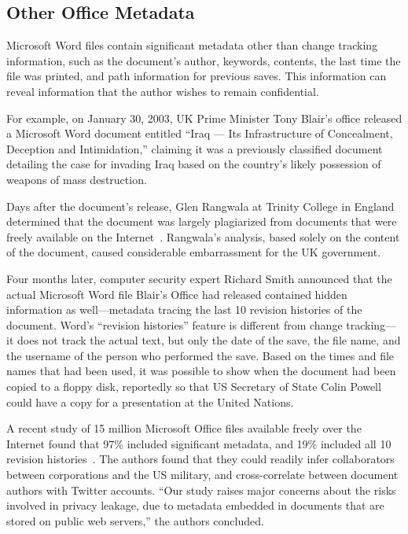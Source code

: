 \subsection{Other Office Metadata}

Microsoft Word files contain significant metadata other than change
tracking information, such as the document's author, keywords,
contents, the last time the file was printed, and path information for
previous saves. This information can reveal information that the
author wishes to remain confidential.

For example, on January 30, 2003,  UK Prime Minister Tony Blair's office released a Microsoft Word document entitled ``Iraq --- Its
Infrastructure of Concealment, Deception and Intimidation,'' claiming
it was a previously classified document detailing the case
for invading Iraq based on the country's likely possession of weapons
of mass destruction. 

Days after the document's release, Glen Rangwala at
Trinity College in England determined that the document was largely
plagiarized from documents that were freely available on the
Internet~\cite{rangwala-2003}.  Rangwala's analysis, based solely on
the content of the document, caused considerable embarrassment for the
UK government.

Four months later, computer security expert Richard Smith
announced that the actual Microsoft Word file Blair's Office had
released contained hidden information as well---metadata tracing the
last 10 revision histories of the document. Word's ``revision
histories'' feature is different from change tracking---it does not
track the actual text, but only the date of the save, the file name,
and the username of the person who performed the save. Based on the
times and file names that had been used, it was possible to show when
the document had been copied to a floppy
disk, reportedly so that US Secretary of State Colin Powell could have
a copy for a presentation at the United Nations\cite{smith-10}.

A recent study of 15 million Microsoft Office files available freely over the
Internet found that 97\% included significant metadata, and 19\%
included all 10 revision histories~\cite{6503202}. The authors found
that they could readily infer collaborators between corporations and
the US military, and cross-correlate between document authors with
Twitter accounts. ``Our study raises major concerns about the risks
involved in privacy leakage, due to metadata embedded in documents
that are stored on public web servers,'' the authors concluded.


